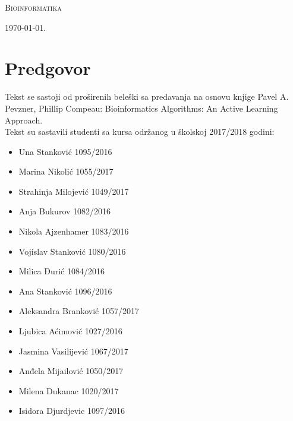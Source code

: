 \documentclass[a4paper]{book}
\begin{document}
\begin{titlepage}
	\vspace*{0.4\textheight}
	
	\begin{center}
		{\Huge \textsc{Bioinformatika}}
	\end{center}
	
	\vfill
	
	\begin{center}
		{\Large \today.}
	\end{center}
\end{titlepage}

\blankpage

\frontmatter
\tableofcontents
\blankpage

\chapter*{Predgovor}
Tekst se sastoji od proširenih beleški sa predavanja na osnovu knjige Pavel A. Pevzner, Phillip Compeau: Bioinformatics Algorithms: An Active Learning Approach. \\Tekst su sastavili studenti sa kursa održanog u školskoj 2017/2018 godini: 
\begin{itemize}
	\item Una Stanković 1095/2016
	\item Marina Nikolić 1055/2017
	\item Strahinja Milojević 1049/2017
	\item Anja Bukurov 1082/2016
	\item Nikola Ajzenhamer 1083/2016
	\item Vojislav Stanković 1080/2016
	\item Milica Đurić 1084/2016
	\item Ana Stanković 1096/2016
	\item Aleksandra Branković 1057/2017
	\item Ljubica Aćimović 1027/2016
	\item Jasmina Vasilijević 1067/2017
	\item Anđela Mijailović 1050/2017
	\item Milena Dukanac 1020/2017
	\item Isidora Djurdjevic 1097/2016
\end{itemize}

\mainmatter









\backmatter
\renewcommand{\bibname}{Literatura}

\begingroup
\raggedright

\endgroup


\end{document}
